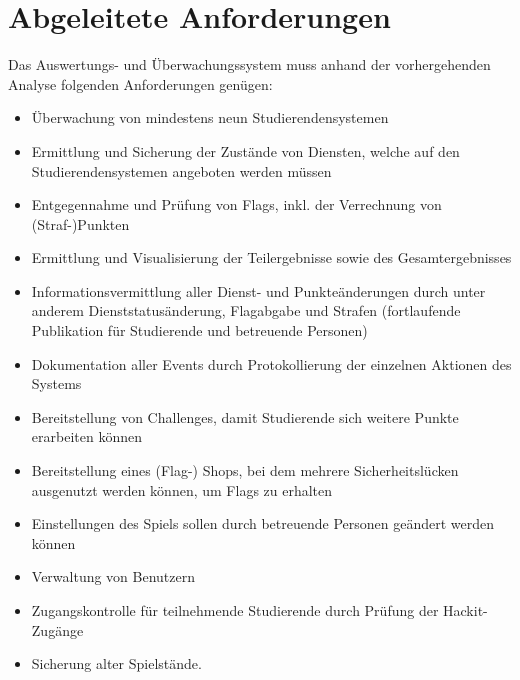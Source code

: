 \section{Abgeleitete Anforderungen}
\label{sec:Abgeleitete_Anforderungen}

Das Auswertungs- und Überwachungssystem muss anhand der vorhergehenden Analyse folgenden Anforderungen genügen:
\begin{itemize}
	\item Überwachung von mindestens neun Studierendensystemen
	\item Ermittlung und Sicherung der Zustände von Diensten, welche auf den Studierendensystemen angeboten werden müssen
	\item Entgegennahme und Prüfung von Flags, inkl. der Verrechnung von (Straf-)Punkten
	\item Ermittlung und Visualisierung der Teilergebnisse sowie des Gesamtergebnisses
	\item Informationsvermittlung aller Dienst- und Punkteänderungen durch unter anderem \linebreak Dienststatusänderung, Flagabgabe und Strafen (fortlaufende Publikation für Studierende und betreuende Personen)
	\item Dokumentation aller Events durch Protokollierung der einzelnen Aktionen des Systems
	\item Bereitstellung von Challenges, damit Studierende sich weitere Punkte erarbeiten können
	\item Bereitstellung eines (Flag-) Shops, bei dem mehrere Sicherheitslücken ausgenutzt werden können, um Flags zu erhalten
	\item Einstellungen des Spiels sollen durch betreuende Personen geändert werden können
	\item Verwaltung von Benutzern
	\item Zugangskontrolle für teilnehmende Studierende durch Prüfung der Hackit-Zugänge
	\item Sicherung alter Spielstände.
\end{itemize}